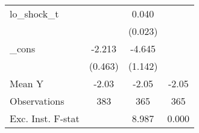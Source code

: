 {\begin{tabular}{l*{3}{c}}
\addlinespace
lo\_shock\_t  &                     &       0.040\sym{*}  &                     \\
            &                     &     (0.023)         &                     \\
\addlinespace
\_cons      &      -2.213\sym{***}&      -4.645\sym{***}&                     \\
            &     (0.463)         &     (1.142)         &                     \\
\midrule
Mean Y      &       -2.03         &       -2.05         &       -2.05         \\
Observations&         383         &         365         &         365         \\
Exc. Inst. F-stat&                     &       8.987         &       0.000         \\
\bottomrule
\end{tabular}
}
